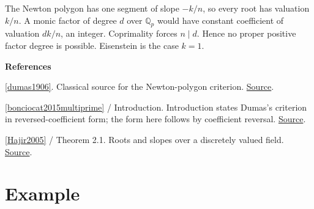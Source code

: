 \documentclass[11pt,a4paper,oneside,openany]{book}
\newenvironment{sources}{\par\smallskip\begingroup\footnotesize\color{atlasgray}\leftskip=10pt\setlength{\parskip}{2pt}}{\par\endgroup\smallskip}
\begin{document}
\color{black} The Newton polygon has one segment of slope \(-k/n\), so every root has valuation \(k/n\). A monic factor of degree \(d\) over \(\mathbb Q_p\) would have constant coefficient of valuation \(dk/n\), an integer. Coprimality forces \(n\mid d\). Hence no proper positive factor degree is possible. Eisenstein is the case \(k=1\).\par
\begin{sources}
\textbf{References}\par\smallskip
\noindent\hyperlink{ref:dumas1906}{[dumas1906]}. Classical source for the Newton-polygon criterion. \href{https://www.numdam.org/item/JMPA_1906_6_2__191_0/}{Source}.\par
\noindent\hyperlink{ref:bonciocat2015multiprime}{[bonciocat2015multiprime]} / Introduction. Introduction states Dumas's criterion in reversed-coefficient form; the form here follows by coefficient reversal. \href{https://www.tandfonline.com/doi/abs/10.1080/00927872.2014.910800}{Source}.\par
\noindent\hyperlink{ref:Hajir2005}{[Hajir2005]} / Theorem 2.1. Roots and slopes over a discretely valued field. \href{https://jtnb.centre-mersenne.org/item/JTNB_2005__17_2_517_0/}{Source}.\par
\end{sources}\color{black}
\section{Example}
\end{document}
